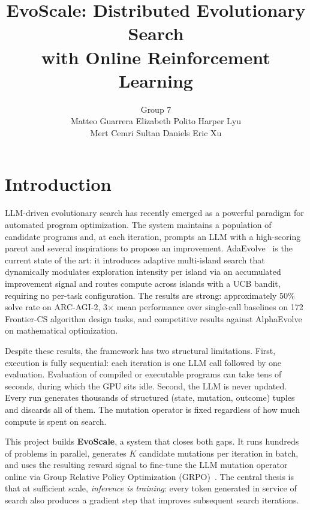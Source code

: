 \documentclass{article}
\author{}
\date{}
\title{EvoScale: Distributed Evolutionary Search\\
  with Online Reinforcement Learning}
\author{
Group 7 \\ Matteo Guarrera \quad Elizabeth Polito \quad Harper Lyu \\ Mert Cemri \quad Sultan Daniels \quad Eric Xu
}
\begin{document}
\maketitle
\author{}
% 
\vspace{-0.5cm}

\vspace{-0.3cm}



\section*{Introduction}

LLM-driven evolutionary search has recently emerged as a powerful paradigm
for automated program optimization. The system maintains a population of
candidate programs and, at each iteration, prompts an LLM with a
high-scoring parent and several inspirations to propose an improvement.
AdaEvolve~\cite{adaevolve2025} is the current state of the art: it
introduces adaptive multi-island search that dynamically modulates
exploration intensity per island via an accumulated improvement signal and
routes compute across islands with a UCB bandit, requiring no per-task
configuration. The results are strong: approximately 50\% solve rate on
ARC-AGI-2, 3$\times$ mean performance over single-call baselines on 172
Frontier-CS algorithm design tasks, and competitive results against
AlphaEvolve on mathematical optimization.

Despite these results, the framework has two structural limitations. First,
execution is fully sequential: each iteration is one LLM call followed by
one evaluation. Evaluation of compiled or executable programs can take tens
of seconds, during which the GPU sits idle. Second, the LLM is never
updated. Every run generates thousands of structured (state, mutation,
outcome) tuples and discards all of them. The mutation operator is fixed
regardless of how much compute is spent on search.

This project builds \textbf{EvoScale}, a system that closes both gaps. It
runs hundreds of problems in parallel, generates $K$ candidate mutations
per iteration in batch, and uses the resulting reward signal to fine-tune
the LLM mutation operator online via Group Relative Policy Optimization
(GRPO)~\cite{deepseekr1}. The central thesis is that at sufficient scale,
\emph{inference is training}: every token generated in service of search
also produces a gradient step that improves subsequent search iterations.
\end{document}
